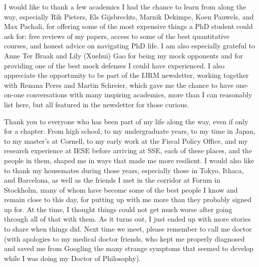 I would like to thank a few academics I had the chance to learn from along the way, especially Rik Pieters, Els Gijsbrechts, Marnik Dekimpe, Koen Pauwels, and Max Pachali, for offering some of the most expensive things a PhD student could ask for: free reviews of my papers, access to some of the best quantitative courses, and honest advice on navigating PhD life. I am also especially grateful to Anne Ter Braak and Lily (Xuehui) Gao for being my mock opponents and for providing one of the best mock defenses I could have experienced. I also appreciate the opportunity to be part of the IJRM newsletter, working together with Renana Peres and Martin Schreier, which gave me the chance to have one-on-one conversations with many inspiring academics, more than I can reasonably list here, but all featured in the newsletter for those curious.


Thank you to everyone who has been part of my life along the way, even if only for a chapter. From high school, to my undergraduate years, to my time in Japan, to my master’s at Cornell, to my early work at the Fiscal Policy Office, and my research experience at IESE before arriving at SSE, each of these places, and the people in them, shaped me in ways that made me more resilient. I would also like to thank my housemates during those years, especially those in Tokyo, Ithaca, and Barcelona, as well as the friends I met in the corridor at Forum in Stockholm, many of whom have become some of the best people I know and remain close to this day, for putting up with me more than they probably signed up for. At the time, I thought things could not get much worse after going through all of that with them. As it turns out, I just ended up with more stories to share when things did. Next time we meet, please remember to call me doctor (with apologies to my medical doctor friends, who kept me properly diagnosed and saved me from Googling the many strange symptoms that seemed to develop while I was doing my Doctor of Philosophy).

